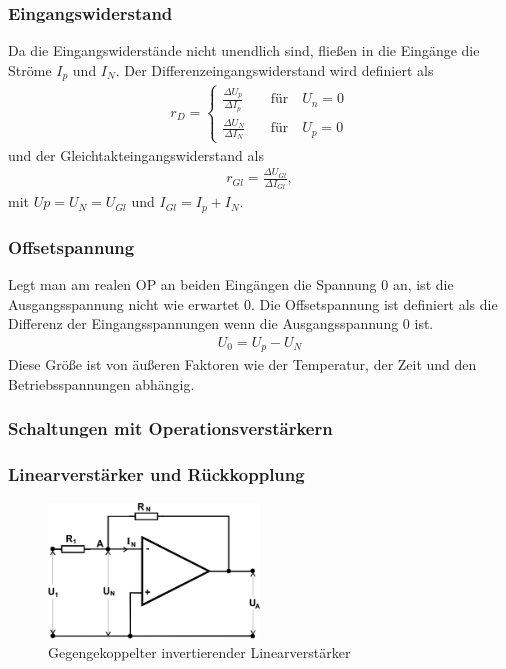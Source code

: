 \subsubsection{Eingangswiderstand}

Da die Eingangswiderstände nicht unendlich sind, fließen in die Eingänge die Ströme $I_p$ und $I_N$.
Der Differenzeingangswiderstand wird definiert als
\begin{align}
	r_D =
	\begin{cases}
		\frac{\Delta U_p}{\Delta I_p} \quad & \text{für} \quad U_n = 0\\
		\frac{\Delta U_N}{\Delta I_N} \quad & \text{für} \quad U_p = 0
	\end{cases}
\end{align}
und der Gleichtakteingangswiderstand als 
\begin{align}
	r_{Gl} = \frac{\Delta U_{Gl}}{\Delta I_{Gl}},
\end{align}
mit $Up = U_N = U_{Gl}$ und $I_{Gl} = I_p + I_N$.

\subsubsection{Offsetspannung}
Legt man am realen OP an beiden Eingängen die Spannung $0$ an, ist die Ausgangsspannung nicht wie erwartet $0$.
Die Offsetspannung ist definiert als die Differenz der Eingangsspannungen wenn die Ausgangsspannung $0$ ist.
\begin{align}
	U_0 = U_p - U_N
\end{align}
Diese Größe ist von äußeren Faktoren wie der Temperatur, der Zeit und den Betriebsspannungen abhängig.

\subsubsection{Schaltungen mit Operationsverstärkern}

\subsubsection{Linearverstärker und Rückkopplung}

\begin{figure}
	\centering
	\includegraphics[width=0.5\textwidth]{img/linamp.png}
	\caption{Gegengekoppelter invertierender Linearverstärker \cite{v51}}
	\label{fig:linamp}
\end{figure}

